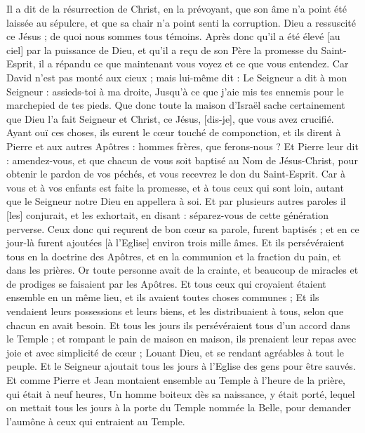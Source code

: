 \begin{multicols}{2}
Il a dit de la résurrection de Christ, en la prévoyant, que son âme n'a point été laissée au sépulcre, et que sa chair n'a point senti la corruption.
Dieu a ressuscité ce Jésus ; de quoi nous sommes tous témoins.
Après donc qu'il a été élevé [au ciel] par la puissance de Dieu, et qu'il a reçu de son Père la promesse du Saint-Esprit, il a répandu ce que maintenant vous voyez et ce que vous entendez.
Car David n'est pas monté aux cieux ; mais lui-même dit : Le Seigneur a dit à mon Seigneur : assieds-toi à ma droite,
Jusqu'à ce que j'aie mis tes ennemis pour le marchepied de tes pieds.
Que donc toute la maison d'Israël sache certainement que Dieu l'a fait Seigneur et Christ, ce Jésus, [dis-je], que vous avez crucifié.
Ayant ouï ces choses, ils eurent le cœur touché de componction, et ils dirent à Pierre et aux autres Apôtres : hommes frères, que ferons-nous ?
Et Pierre leur dit : amendez-vous, et que chacun de vous soit baptisé au Nom de Jésus-Christ, pour obtenir le pardon de vos péchés, et vous recevrez le don du Saint-Esprit.
Car à vous et à vos enfants est faite la promesse, et à tous ceux qui sont loin, autant que le Seigneur notre Dieu en appellera à soi.
Et par plusieurs autres paroles il [les] conjurait, et les exhortait, en disant : séparez-vous de cette génération perverse.
Ceux donc qui reçurent de bon cœur sa parole, furent baptisés ; et en ce jour-là furent ajoutées [à l'Eglise] environ trois mille âmes.
Et ils persévéraient tous en la doctrine des Apôtres, et en la communion et la fraction du pain, et dans les prières.
Or toute personne avait de la crainte, et beaucoup de miracles et de prodiges se faisaient par les Apôtres.
Et tous ceux qui croyaient étaient ensemble en un même lieu, et ils avaient toutes choses communes ;
Et ils vendaient leurs possessions et leurs biens, et les distribuaient à tous, selon que chacun en avait besoin.
Et tous les jours ils persévéraient tous d'un accord dans le Temple ; et rompant le pain de maison en maison, ils prenaient leur repas avec joie et avec simplicité de cœur ;
Louant Dieu, et se rendant agréables à tout le peuple. Et le Seigneur ajoutait tous les jours à l'Eglise des gens pour être sauvés.
\VerseOne{}Et comme Pierre et Jean montaient ensemble au Temple à l'heure de la prière, qui était à neuf heures,
Un homme boiteux dès sa naissance, y était porté, lequel on mettait tous les jours à la porte du Temple nommée la Belle, pour demander l'aumône à ceux qui entraient au Temple.

\end{multicols}
